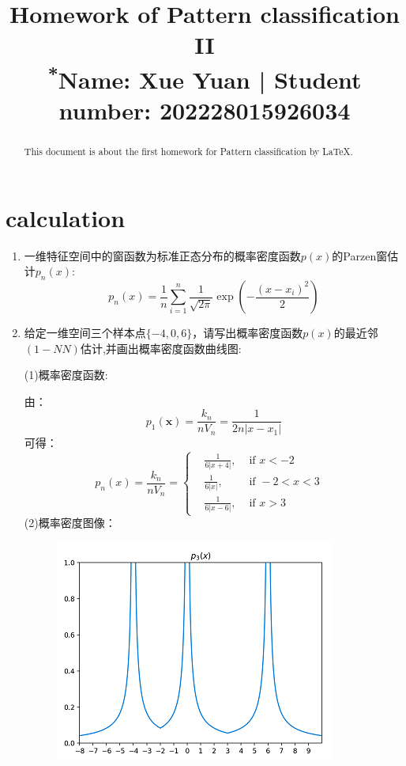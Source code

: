 \documentclass[homework]{IEEEtran}
\begin{document}
\title{Homework of Pattern classification II\\
{\footnotesize \textsuperscript{*}Name: Xue Yuan  | Student number: 202228015926034}
}

\author{}
\maketitle

\begin{abstract}
This document is about the first homework for Pattern classification by \LaTeX.
\end{abstract}

\section{calculation}
\begin{CJK}{UTF8}{gkai}
    \begin{enumerate}
		\item 一维特征空间中的窗函数为标准正态分布的概率密度函数$p(x)$的Parzen窗估计$p_n(x)$:  $$ p_n(x)=\frac{1}{n} \sum_{i=1}^n \frac{1}{\sqrt{2 \pi}} \exp \left(-\frac{(x-x_i)^{2}}{2}\right) $$
		\item 给定一维空间三个样本点$\{-4,0,6\}$，请写出概率密度函数$p(x)$的最近邻$(1-NN)$估计,并画出概率密度函数曲线图: \par
		(1)概率密度函数:  \par
        由：$$p_{1}(\mathbf{x})=\frac{k_{n}}{n V_{n}}=\frac{1}{2 n\left|x-x_{1}\right|}$$
        可得：$$p_{n}(x)=\frac{k_{n}}{n V_{n}}=\left\{\begin{aligned}
            &\frac{1}{6|x+4|},  & \text { if } x<-2&\\
            &\frac{1}{6|x|},    & \text { if }-2<x<3& \\
            &\frac{1}{6|x-6|},  & \text { if } x>3&
            \end{aligned}
            \right.$$
        (2)概率密度图像：
            \begin{figure}[htb]
                \centerline{\includegraphics{Images/fig1.png}}

\end{figure}
\end{enumerate}
\end{CJK}
\end{document}

